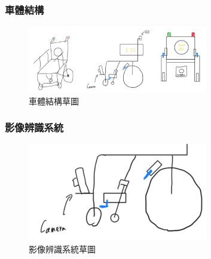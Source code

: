\documentclass[12pt]{article}       %
\begin{document}
\subsubsection{車體結構}
\hspace{2em}
\begin{figure}[H]
    \centering
    \includegraphics[width=0.7\textwidth]{2.jpg}     %
    \caption{車體結構草圖}    %
    \label{fig:2}    %
\end{figure}

\subsubsection{影像辨識系統}
\hspace{2em}
\begin{figure}[H]
    \centering
    \includegraphics[width=0.7\textwidth]{3.jpg}     %
    \caption{影像辨識系統草圖}    %
    \label{fig:3}    %
\end{figure}
\end{document}
